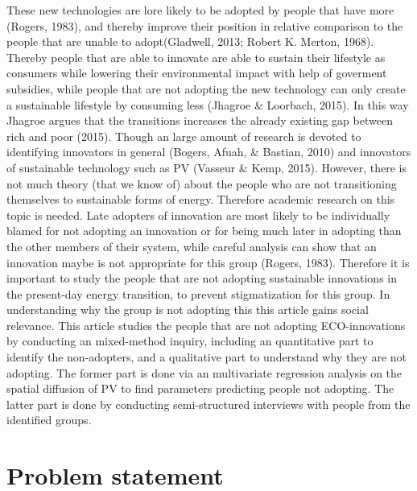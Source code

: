 \documentclass[man,floatsintext]{apa6}
\begin{document}
These new technologies are lore likely to be adopted by people that have
more (Rogers, 1983), and thereby improve their position in relative
comparison to the people that are unable to adopt(Gladwell, 2013; Robert
K. Merton, 1968). Thereby people that are able to innovate are able to
sustain their lifestyle as consumers while lowering their environmental
impact with help of goverment subsidies, while people that are not
adopting the new technology can only create a sustainable lifestyle by
consuming less (Jhagroe \& Loorbach, 2015). In this way Jhagroe argues
that the transitions increases the already existing gap between rich and
poor (2015). Though an large amount of research is devoted to
identifying innovators in general (Bogers, Afuah, \& Bastian, 2010) and
innovators of sustainable technology such as PV (Vasseur \& Kemp, 2015).
However, there is not much theory (that we know of) about the people who
are not transitioning themselves to sustainable forms of energy.
Therefore academic research on this topic is needed. Late adopters of
innovation are most likely to be individually blamed for not adopting an
innovation or for being much later in adopting than the other members of
their system, while careful analysis can show that an innovation maybe
is not appropriate for this group (Rogers, 1983). Therefore it is
important to study the people that are not adopting sustainable
innovations in the present-day energy transition, to prevent
stigmatization for this group. In understanding why the group is not
adopting this this article gains social relevance. This article studies
the people that are not adopting ECO-innovations by conducting an
mixed-method inquiry, including an quantitative part to identify the
non-adopters, and a qualitative part to understand why they are not
adopting. The former part is done via an multivariate regression
analysis on the spatial diffusion of PV to find parameters predicting
people not adopting. The latter part is done by conducting
semi-structured interviews with people from the identified groups.

\section{Problem statement}\label{problem-statement}
\end{document}

